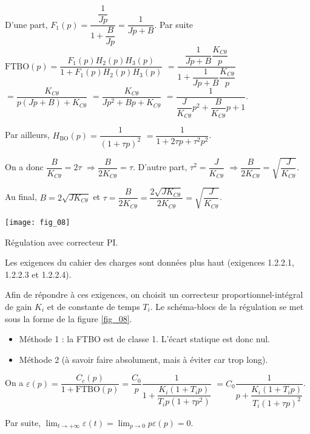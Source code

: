 \ifprof
\begin{corrige}
D'une part, $F_1(p)=\dfrac{\dfrac{1}{Jp}}{1+\dfrac{B}{Jp}} = \dfrac{1}{Jp+B}$.
Par suite $\text{FTBO}(p) = \dfrac{F_1(p) H_2(p) H_3(p)}{1+F_1(p) H_2(p) H_3(p)}$
$= \dfrac{\dfrac{1}{Jp+B} \dfrac{K_{C\theta}}{p}}{1+\dfrac{1}{Jp+B} \dfrac{K_{C\theta}}{p}}$
$= \dfrac{K_{C\theta}}{p\left(Jp+B\right)+K_{C\theta}}$
$= \dfrac{K_{C\theta}}{Jp^2+Bp+K_{C\theta}}$
$= \dfrac{1}{\dfrac{J}{K_{C\theta}}p^2+\dfrac{B}{K_{C\theta}}p+1}$.

Par ailleurs, 
$H_{\text{BO}}(p)=\dfrac{1}{\left(1+\tau p\right)^2}$
$=\dfrac{1}{1+2\tau p + \tau^2 p^2}$.

On a donc $\dfrac{B}{K_{C\theta}} = 2\tau$ $\Rightarrow \dfrac{B}{2K_{C\theta}} =\tau$.
D'autre part, $ \tau^2 =\dfrac{J}{K_{C\theta}}$  $\Rightarrow \dfrac{B}{2K_{C\theta}}=\sqrt{\dfrac{J}{K_{C\theta}}}$. 


Au final, ${B}=2\sqrt{JK_{C\theta}}$ et $\tau = \dfrac{B}{2K_{C\theta}} =\dfrac{2\sqrt{JK_{C\theta}}}{2K_{C\theta}}=\sqrt{\dfrac{J}{K_{C\theta}}}$.

\end{corrige}
\else
\fi


\begin{marginfigure}
\centering
\texttt{[image: fig\_08]}
\caption{Régulation avec correcteur PI. \label{fig_08}}
\end{marginfigure}

Les exigences du cahier des charges sont données plus haut (exigences 1.2.2.1, 1.2.2.3 et 1.2.2.4).

Afin de répondre à ces exigences, on choisit un correcteur proportionnel-intégral de gain $K_i$ et de constante de temps $T_i$. Le schéma-blocs de la régulation se met sous la forme de la figure \ref{fig_08}.



\ifprof
\begin{corrige}
\begin{itemize}
\item Méthode 1 : la FTBO est de classe 1. L'écart statique est donc nul. 
\end{itemize}

\begin{itemize}
\item Méthode 2 (à savoir faire absolument, mais à éviter car trop long).
\end{itemize}

On a $\varepsilon(p) = \dfrac{C_c(p)}{1+\text{FTBO}(p)}=\dfrac{C_0}{p}\dfrac{1}{1+\dfrac{K_i (1+T_i p)}{T_i p (1+\tau p ^2)}}$
$=C_0\dfrac{1}{p+\dfrac{K_i (1+T_i p)}{T_i (1+\tau p )^2}}$.

Par suite, $\lim_{t\to + \infty} \varepsilon(t)=\lim_{p\to 0} p \varepsilon(p)=0$.

\end{corrige}
\else
\fi


